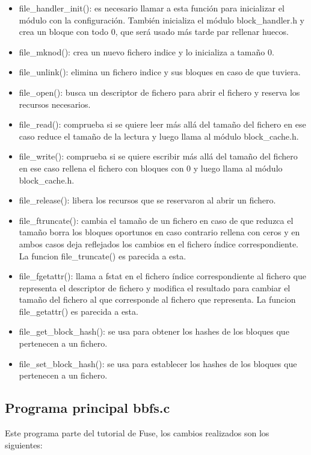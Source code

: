 \documentclass[a4paper,12pt]{article}
\begin{document}
\begin{itemize}
\item file\_handler\_init(): es necesario llamar a esta función para inicializar el módulo con la configuración. También inicializa el módulo block\_handler.h y crea un bloque con todo 0, que será  usado más tarde par rellenar huecos.
\item file\_mknod(): crea un nuevo fichero indice y lo inicializa a tamaño 0.
\item file\_unlink(): elimina un fichero indice y sus bloques en caso de que tuviera.
\item file\_open(): busca un descriptor de fichero para abrir el fichero y reserva los recursos necesarios.
\item file\_read(): comprueba si se quiere leer más allá del tamaño del fichero en ese caso reduce el tamaño de la lectura y luego llama al módulo block\_cache.h.
\item file\_write(): comprueba si se quiere escribir más allá del tamaño del fichero en ese caso rellena el fichero con bloques con 0 y luego llama al módulo block\_cache.h.
\item file\_release(): libera los recursos que se reservaron al abrir un fichero.
\item file\_ftruncate(): cambia el tamaño de un fichero en caso de que reduzca el tamaño borra los bloques oportunos en caso contrario rellena con ceros y en ambos casos deja reflejados los cambios en el fichero índice correspondiente. La funcion file\_truncate() es parecida a esta.
\item file\_fgetattr(): llama a fstat en el fichero índice correspondiente al fichero que representa el descriptor de fichero y modifica el resultado para cambiar el tamaño del fichero al que corresponde al fichero que representa. La funcion file\_getattr() es parecida a esta.
\item file\_get\_block\_hash(): se usa para obtener los hashes de los bloques que pertenecen a un fichero.
\item file\_set\_block\_hash(): se usa para establecer los hashes de los bloques que pertenecen a un fichero.
\end{itemize}


\subsection{Programa principal bbfs.c}

Este programa parte del tutorial de Fuse, los cambios realizados son los siguientes:
\end{document}
